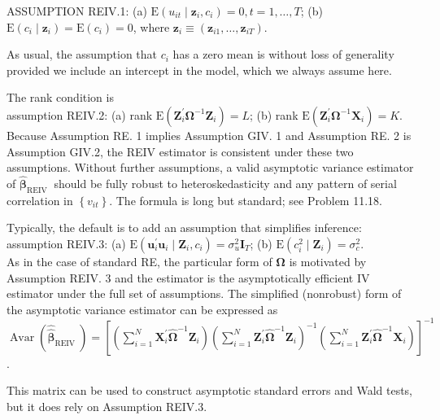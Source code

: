 \documentclass[10pt]{article}
\begin{document}
ASSUMPTION REIV.1: (a) $\mathrm{E}\left(u_{i t} \mid \mathbf{z}_{i}, c_{i}\right)=0, t=1, \ldots, T$; (b) $\mathrm{E}\left(c_{i} \mid \mathbf{z}_{i}\right)=\mathrm{E}\left(c_{i}\right)=0$, where $\mathbf{z}_{i} \equiv\left(\mathbf{z}_{i 1}, \ldots, \mathbf{z}_{i T}\right)$.

As usual, the assumption that $c_{i}$ has a zero mean is without loss of generality provided we include an intercept in the model, which we always assume here.

The rank condition is\\
assumption REIV.2: (a) rank $\mathrm{E}\left(\mathbf{Z}_{i}^{\prime} \boldsymbol{\Omega}^{-1} \mathbf{Z}_{i}\right)=L$; (b) rank $\mathrm{E}\left(\mathbf{Z}_{i}^{\prime} \boldsymbol{\Omega}^{-1} \mathbf{X}_{i}\right)=K$.\\
Because Assumption RE. 1 implies Assumption GIV. 1 and Assumption RE. 2 is Assumption GIV.2, the REIV estimator is consistent under these two assumptions. Without further assumptions, a valid asymptotic variance estimator of $\hat{\boldsymbol{\beta}}_{\text {REIV }}$ should be fully robust to heteroskedasticity and any pattern of serial correlation in $\left\{v_{i t}\right\}$. The formula is long but standard; see Problem 11.18.

Typically, the default is to add an assumption that simplifies inference:\\
assumption REIV.3: (a) $\mathrm{E}\left(\mathbf{u}_{i}^{\prime} \mathbf{u}_{i} \mid \mathbf{Z}_{i}, c_{i}\right)=\sigma_{u}^{2} \mathbf{I}_{T}$; (b) $\mathrm{E}\left(c_{i}^{2} \mid \mathbf{Z}_{i}\right)=\sigma_{c}^{2}$.\\
As in the case of standard RE, the particular form of $\boldsymbol{\Omega}$ is motivated by Assumption REIV. 3 and the estimator is the asymptotically efficient IV estimator under the full set of assumptions. The simplified (nonrobust) form of the asymptotic variance estimator can be expressed as\\
$\operatorname{Avar}\left(\widehat{\hat{\boldsymbol{\beta}}}_{\text {REIV }}\right)=\left[\left(\sum_{i=1}^{N} \mathbf{X}_{i}^{\prime} \hat{\boldsymbol{\Omega}}^{-1} \mathbf{Z}_{i}\right)\left(\sum_{i=1}^{N} \mathbf{Z}_{i}^{\prime} \hat{\boldsymbol{\Omega}}^{-1} \mathbf{Z}_{i}\right)^{-1}\left(\sum_{i=1}^{N} \mathbf{Z}_{i}^{\prime} \hat{\boldsymbol{\Omega}}^{-1} \mathbf{X}_{i}\right)\right]^{-1}$.

This matrix can be used to construct asymptotic standard errors and Wald tests, but it does rely on Assumption REIV.3.
\end{document}
